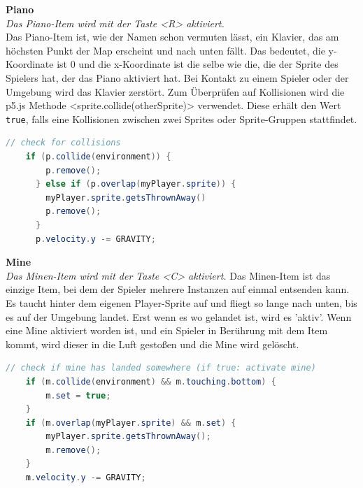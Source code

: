 \textbf{Piano}
\\
\textit{Das Piano-Item wird mit der Taste <R> aktiviert.}
\\
Das Piano-Item ist, wie der Namen schon vermuten lässt, ein Klavier, das am höchsten Punkt der Map erscheint und nach unten fällt.
Das bedeutet, die y-Koordinate ist 0 und die x-Koordinate ist die selbe wie die, die der Sprite des Spielers hat, der das Piano aktiviert hat.
Bei Kontakt zu einem Spieler oder der Umgebung wird das Klavier zerstört. Zum Überprüfen auf Kollisionen wird die p5.js Methode <sprite.collide(otherSprite)> verwendet.
Diese erhält den Wert \texttt{true}, falls eine Kollisionen zwischen zwei Sprites oder Sprite-Gruppen stattfindet.
\\
\begin{lstlisting}[caption=Piano-Item Physics,language=Java,label=lst:impl:pianoPhy]
    // check for collisions
    if (p.collide(environment)) {
        p.remove();
      } else if (p.overlap(myPlayer.sprite)) {
        myPlayer.sprite.getsThrownAway()
        p.remove();
      }
      p.velocity.y -= GRAVITY;
\end{lstlisting}

\textbf{Mine}
\\
\textit{Das Minen-Item wird mit der Taste <C> aktiviert.}
Das Minen-Item ist das einzige Item, bei dem der Spieler mehrere Instanzen auf einmal entsenden kann.
Es taucht hinter dem eigenen Player-Sprite auf und fliegt so lange nach unten, bis es auf der Umgebung landet. Erst wenn es wo gelandet ist, wird es 'aktiv'.
Wenn eine Mine aktiviert worden ist, und ein Spieler in Berührung mit dem Item kommt, wird dieser in die Luft gestoßen und die Mine wird gelöscht.
\\
\begin{lstlisting}[caption=Mine-Item Physics,language=Java,label=lst:impl:minePhy]
    // check if mine has landed somewhere (if true: activate mine)
    if (m.collide(environment) && m.touching.bottom) {
        m.set = true;
    }
    if (m.overlap(myPlayer.sprite) && m.set) {
        myPlayer.sprite.getsThrownAway();
        m.remove();
    }
    m.velocity.y -= GRAVITY;
\end{lstlisting}

